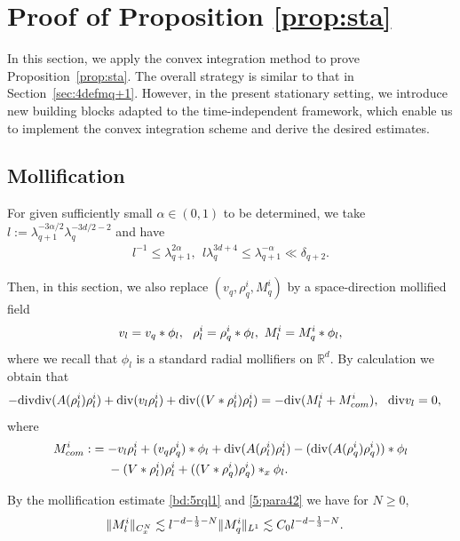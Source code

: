 \documentclass[UTF-8,reqno]{amsart}
\numberwithin{equation}{section}
\theoremstyle{definition}
\def\geq{\geqslant}
\def\leq{\leqslant}
\def\div{\mathord{{\rm div}}}
\def\geq{\geqslant}
\def\leq{\leqslant}
\def\div{\mathord{{\rm div}}}
\begin{document}
  


\section{Proof of Proposition \ref{prop:sta}}\label{sec:convexsta}
In this section, we apply the convex integration method to prove Proposition~\ref{prop:sta}. 
The overall strategy is similar to that in Section~\ref{sec:4defmq+1}. 
However, in the present stationary setting, we introduce new building blocks adapted to the time-independent framework, which enable us to implement the convex integration scheme and derive the desired estimates.

\subsection{Mollification}\label{sec:mpll5}
For given sufficiently small $\alpha\in(0,1)$ to be determined, we  take  $ {l}:=\lambda_{q+1}^{-3\alpha/{2}}\lambda_{q}^{-3d/2-2}$ and have 
 \begin{align}
     {l}^{-1}\leq\lambda_{q+1}^{2\alpha},\ \   l\lambda_q^{3d+4} \leq 
     \lambda_{q+1}^{-\alpha}\ll\delta_{q+2}.\label{5:para42}
 \end{align} 

Then,  in this section, we also replace $(v_{q},  \rho^i_{q},M^i_q)$ by a space-direction mollified field  
\begin{align}
v_l=v_{q}*\phi_l,\ \ 
   \rho^i_l=  \rho^i_{q}*\phi_l,\  M^i_l=M^i_{q}* \phi_l,\notag
\end{align}
where we recall that $\phi_l$ is a   standard radial mollifiers on $\mathbb{R}^{d}$.  
By calculation we obtain that 
\begin{align*}
-\div\div (A(\rho^i _l) \rho^i_{l})+\div(v_l   \rho^i_l)+\div((V*\rho_l^i)\rho_l^i)&=-\div (M^i_l+M^i_{com} ),\ \
\div v_l=0,
\end{align*}
where
\begin{align*}
M^i_{com} :&=-v_l   \rho^i_l+(v_{q}   \rho^i_{q})* \phi_l+\div( A(  \rho^i_{l}) \rho^i_{l})-( \div (A(  \rho^i_{q})  \rho^i_{q}))* \phi_l\\
&\ \ \ \   -(V*\rho_l^i)\rho_l^i+((V*\rho_q^i)\rho_q^i)*_x\phi_l.\notag
\end{align*}

By the mollification estimate \eqref{bd:5rql1}
 and \eqref{5:para42}  we have for $N\geq 0$,
\begin{align}
    \|M^i_l \|_{C_{x}^N}&\lesssim l^{-d-\frac13-N} \|M^i_{q } \|_{L^1}\lesssim C_0  l^{-d-\frac13-N}. \notag
 \end{align} 
\end{document}
